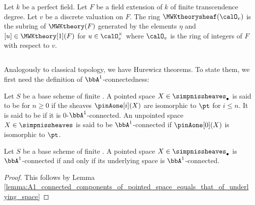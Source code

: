 \begin{theorem}
Let $k$ be a perfect field. Let $F$ be a field extension of $k$ of finite transcendence degree. Let $v$ be a discrete valuation on $F$. The ring $\MWKtheorysheaf(\calO_v)$ is the subring of $\MWKtheory(F)$ generated by the elements $\eta$ and $[u] \in \MWKtheory[1](F)$ for $u \in \calO_v^\times$ where $\calO_v$ is the ring of integers of $F$ with respect to $v$.
\end{theorem}

\subsection{}

Analogously to classical topology, we have Hurewicz theorems. To state them, we first need the definition of $\bbA^1$-connectedness:

\begin{definition}
    Let $S$ be a  base scheme of finite .
    A pointed space $X \in \simpnissheaves_\bullet$ is said to be   for $n \geq 0$ if the sheaves $\pinAone[i](X)$ are isomorphic to $\pt$ for $i \leq n$. It is said to be  if it is $0$-$\bbA^1$-connected.
    An unpointed space $X \in \simpnissheaves$ is said to be $\bbA^1$-connected if $\pinAone[0](X)$ is isomorphic to $\pt$. 
\end{definition}
\begin{lemma}
    Let $S$ be a  base scheme of finite . A pointed space $X \in \simpnissheaves_\bullet$ is $\bbA^1$-connected if and only if its underlying space is $\bbA^1$-connected.
\end{lemma}
\begin{proof}
    This follows by Lemma \ref{lemma:A1_connected_components_of_pointed_space_equals_that_of_underlying_space}
\end{proof}


